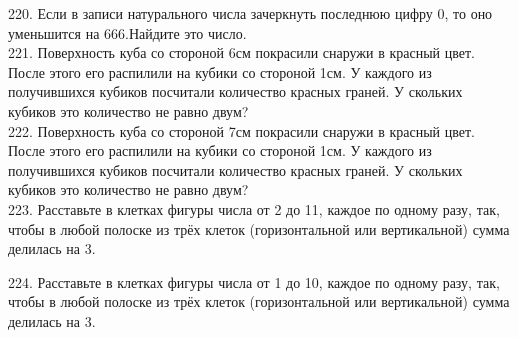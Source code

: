 \documentclass[12pt]{article}
\begin{document}
220. Если в записи натурального числа зачеркнуть последнюю цифру 0, то оно уменьшится на 666.Найдите это число.\\
221. Поверхность куба со стороной 6см покрасили снаружи в красный цвет. После этого его распилили на кубики со стороной 1см. У каждого из получившихся кубиков посчитали количество красных граней. У скольких кубиков это количество не равно двум?\\
222. Поверхность куба со стороной 7см покрасили снаружи в красный цвет. После этого его распилили на кубики со стороной 1см. У каждого из получившихся кубиков посчитали количество красных граней. У скольких кубиков это количество не равно двум?\\
223. Расставьте в клетках фигуры числа от 2 до 11, каждое по одному разу, так, чтобы в любой полоске из трёх клеток (горизонтальной или вертикальной) сумма делилась на 3.
\begin{center}
\begin{figure}[ht!]
\end{figure}
\end{center}
224. Расставьте в клетках фигуры числа от 1 до 10, каждое по одному разу, так, чтобы в любой полоске из трёх клеток (горизонтальной или вертикальной) сумма делилась на 3.
\begin{center}
\begin{figure}[ht!]
\end{figure}
\end{center}
\end{document}
